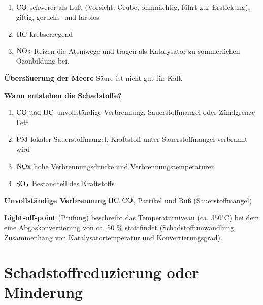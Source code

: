 \begin{enumerate}
\item
  $\ce{CO}$ schwerer als Luft (Vorsicht: Grube, ohnmächtig, führt zur
  Erstickung), giftig, geruchs- und farblos
\item
  $\ce{HC}$ krebserregend
\item
  $\ce{NOx}$ Reizen die Atemwege und tragen als Katalysator zu
  sommerlichen Ozonbildung bei.
\end{enumerate}

\textbf{Übersäuerung der Meere} Säure ist nicht gut für Kalk

\textbf{Wann entstehen die Schadstoffe?}

\begin{enumerate}
\item
  $\ce{CO} \text{ und } \ce{HC}$ unvollständige Verbrennung,
  Sauerstoffmangel oder Zündgrenze Fett
\item
  $\ce{PM}$ lokaler Sauerstoffmangel, Kraftstoff unter
  Sauerstoffmangel verbrannt wird
\item
  $\ce{NOx}$ hohe Verbrennungsdrücke und Verbrennungstemperaturen
\item
  $\ce{SO2}$ Bestandteil des Kraftstoffs
\end{enumerate}

\textbf{Unvollständige Verbrennung} $\ce{HC}, \ce{CO}$, Partikel und
Ruß (Sauerstoffmangel)

\textbf{Light-off-point} (Prüfung) beschreibt das Temperaturniveau (ca.
$350^\circ\text{C}$) bei dem eine Abgaskonvertierung von ca. 50 \%
stattfindet (Schadstoffumwandlung, Zusammenhang von
Katalysatortemperatur und Konvertierungsgrad).

\section{Schadstoffreduzierung oder
Minderung}\label{schadstoffreduzierung-oder-minderung}

